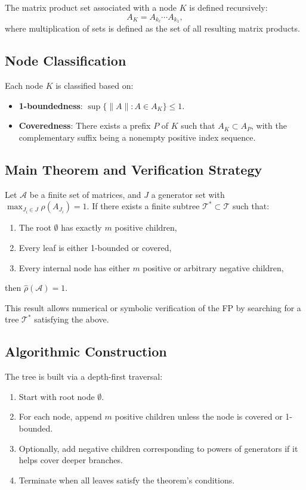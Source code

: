 The matrix product set associated with a node $K$ is defined recursively:
\[
A_K = A_{k_\ell} \cdots A_{k_1},
\]
where multiplication of sets is defined as the set of all resulting matrix products.

\subsection{Node Classification}

Each node $K$ is classified based on:
\begin{itemize}
  \item \textbf{1-boundedness}: $\sup\{\|A\| : A \in A_K\} \leq 1$.
  \item \textbf{Coveredness}: There exists a prefix $P$ of $K$ such that $A_K \subset A_P$, with the complementary suffix being a nonempty positive index sequence.
\end{itemize}

\subsection{Main Theorem and Verification Strategy}

\begin{theorem}
Let $\mathcal{A}$ be a finite set of matrices, and $J$ a generator set with $\max_{J_i \in J} \rho(A_{J_i}) = 1$. If there exists a finite subtree $\mathcal{T}^* \subset \mathcal{T}$ such that:
\begin{enumerate}
  \item The root $\emptyset$ has exactly $m$ positive children,
  \item Every leaf is either 1-bounded or covered,
  \item Every internal node has either $m$ positive or arbitrary negative children,
\end{enumerate}
then $\hat{\rho}(\mathcal{A}) = 1$.
\end{theorem}

This result allows numerical or symbolic verification of the FP by searching for a tree $\mathcal{T}^*$ satisfying the above.

\subsection{Algorithmic Construction}

The tree is built via a depth-first traversal:
\begin{enumerate}
  \item Start with root node $\emptyset$.
  \item For each node, append $m$ positive children unless the node is covered or 1-bounded.
  \item Optionally, add negative children corresponding to powers of generators if it helps cover deeper branches.
  \item Terminate when all leaves satisfy the theorem's conditions.
\end{enumerate}

